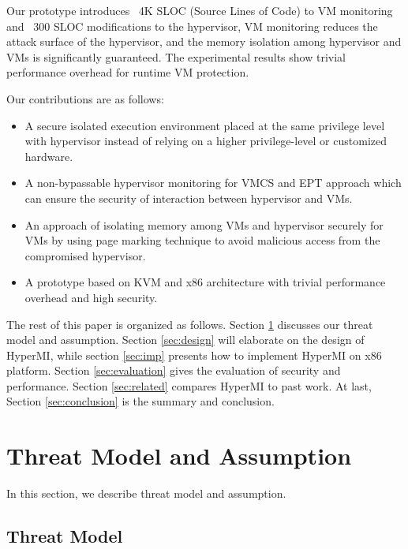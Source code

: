 \documentclass[conference]{IEEEtran}
\begin{document}
Our prototype introduces ~4K SLOC (Source Lines of Code) to VM monitoring and ~300 SLOC modifications to the hypervisor, VM monitoring reduces the attack surface of the hypervisor, and the memory isolation among hypervisor and VMs is significantly guaranteed. The experimental results show trivial performance overhead for runtime VM protection. 


Our contributions are as follows:
\begin{itemize}
\item A secure isolated execution environment placed at the same privilege level with hypervisor instead of relying on a higher privilege-level or customized hardware.
\item{A non-bypassable hypervisor monitoring for VMCS and EPT approach  which can ensure the security of interaction between hypervisor and VMs.}
\item{An approach of isolating memory among VMs and hypervisor securely for VMs by using page marking technique to avoid malicious access from the compromised hypervisor.}



\item{A prototype based on KVM and x86 architecture with trivial performance overhead and high security.}

\end{itemize}
The rest of this paper is organized as follows. Section \ref{sec:threat} discusses our threat model and assumption. Section \ref{sec:design} will elaborate on the design of HyperMI, while section \ref{sec:imp} presents how to implement HyperMI on x86 platform. Section \ref{sec:evaluation} gives the evaluation of security and performance. Section \ref{sec:related} compares HyperMI to past work. At last, Section \ref{sec:conclusion} is the summary and conclusion.





\section{Threat Model and Assumption}\label{sec:threat}

In this section, we describe threat model and assumption.


\subsection{Threat Model} \label {threat}
\end{document}
